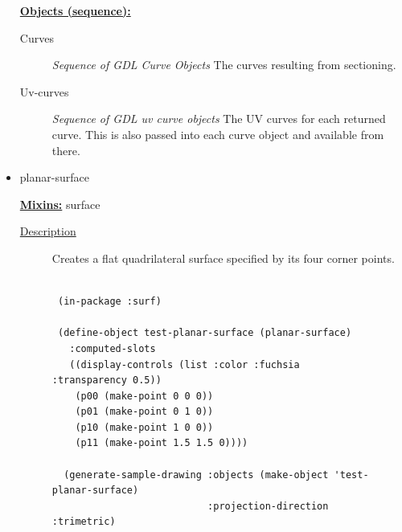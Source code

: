 \documentclass [11pt]{book}
\begin{document}
\begin{itemize}
\begin{description}
\end{description}






\textbf{
\underline{Objects (sequence):}}

\begin{description}

\item [Curves]
\emph{Sequence of GDL Curve Objects} The curves resulting from sectioning.


\item [Uv-curves]
\emph{Sequence of GDL uv curve objects} The UV curves for each returned curve. This is also passed into each
curve object and available from there.


\end{description}







\item {}planar-surface


\textbf{
\underline{Mixins:}} surface





\begin{description}

\item [
\underline{Description}]


Creates a flat quadrilateral surface specified by its four corner points.



\end{description}




\begin{figure}
\begin{lrbox}{\boxedverb}
\begin{minipage}{\linewidth}
{\small

\begin{verbatim}

 (in-package :surf)

 (define-object test-planar-surface (planar-surface)
   :computed-slots
   ((display-controls (list :color :fuchsia :transparency 0.5))
    (p00 (make-point 0 0 0))
    (p01 (make-point 0 1 0))
    (p10 (make-point 1 0 0))
    (p11 (make-point 1.5 1.5 0))))

  (generate-sample-drawing :objects (make-object 'test-planar-surface)
                           :projection-direction :trimetric)




\end{verbatim}}
\end{minipage}
\end{lrbox}
\end{figure}
\end{itemize}
\end{document}
